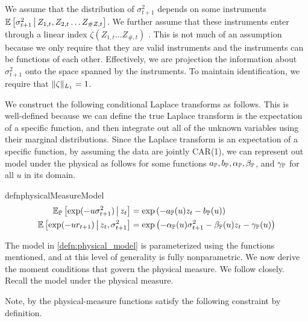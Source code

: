 \documentclass[11pt, letterpaper, twoside, final]{article}
\begin{document}
We assume that the distribution of $\sigma^2_{t+1}$ depends on some instruments $\operatorname{\mathbb{E}}\left[\sigma^2_{t+1}
\,\middle\vert\, Z_{1,t}, Z_{2,t} \ldots Z_{\# Z, t} \right]$. 
We further assume that these instruments enter through a linear index $\zeta (Z_{1,t} \ldots Z_{\#, t})$ .
This is not much of an assumption because we only require that they are valid instruments and the instruments can
be functions of each other.
Effectively, we are projection the information about $\sigma^2_{t+1}$ onto the space spanned by  the instruments.
To maintain identification, we require that $\lVert\zeta\rVert_{L_1} = 1$.
    

We construct the following conditional Laplace transforms as follows.
This is well-defined because we can define the true Laplace transform is the expectation of a specific function,
and then integrate out all of the unknown variables using their marginal distributions.
Since the Laplace transform is an expectation of a specific function, by assuming the data are jointly CAR(1), we
can represent out model under the physical  as follows for some functions $a_{\mathbb{P}}, b_{\mathbb{P}}, \alpha_{\mathbb{P}},
    \beta_{\mathbb{P}}$, and $\gamma_{\mathbb{P}}$ for all $u$ in its domain.

\begin{restatable}{defn}{physicalMeasureModel}
    \label{defn:physical_model}
    \begin{align}
        \operatorname{\mathbb{E}}_{\mathbb{P}} \left[\exp(-u \sigma^2_{t+1}) \,\middle\vert\, z_t \right] &= \exp\left( - a_{\mathbb{P}}(u) z_t -
        b_{\mathbb{P}}(u) \right) \\
        \operatorname{\mathbb{E}}\left[\exp(-u r_{t+1}) \,\middle\vert\, z_t,  \sigma^2_{t+1}\right] &= \exp\left(- \alpha_{\mathbb{P}}(u)
        \sigma^2_{t+1} - \beta_{\mathbb{P}}(u)z_t - \gamma_{\mathbb{P}}(u) \right) 
    \end{align}
\end{restatable}

The model in \cref{defn:physical_model} is parameterized using the functions mentioned, and at this level of
generality is fully nonparametric. 
We now derive the moment conditions that govern the physical measure. 
We follow \textcite{khrapov2016affine} closely.
Recall the model under the physical measure. 


Note, by the physical-measure functions satisfy the following constraint by definition.
\end{document}
